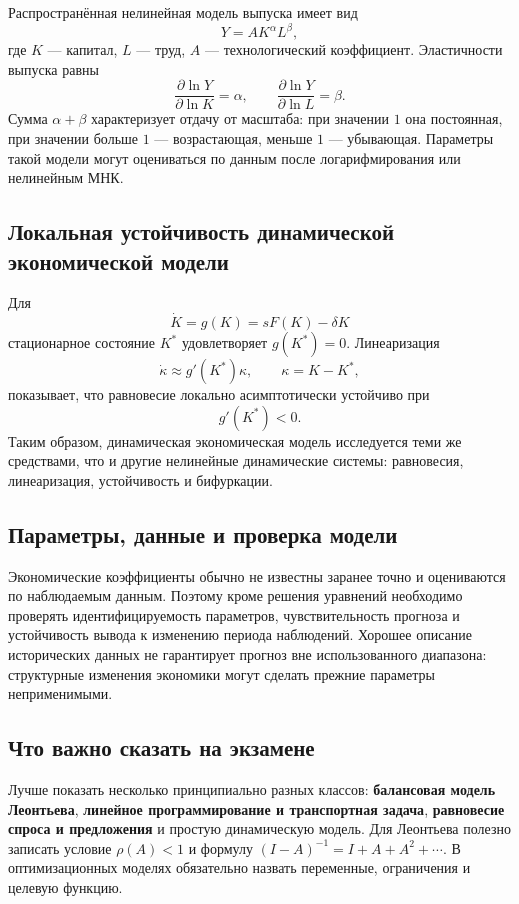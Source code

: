 Распространённая нелинейная модель выпуска имеет вид
\[
    \boxed{Y=A K^\alpha L^\beta,}
\]
где $K$ --- капитал, $L$ --- труд, $A$ --- технологический коэффициент.
Эластичности выпуска равны
\[
    \frac{\partial\ln Y}{\partial\ln K}=\alpha,
    \qquad
    \frac{\partial\ln Y}{\partial\ln L}=\beta.
\]
Сумма $\alpha+\beta$ характеризует отдачу от масштаба: при значении $1$ она
постоянная, при значении больше $1$ --- возрастающая, меньше $1$ --- убывающая.
Параметры такой модели могут оцениваться по данным после логарифмирования или
нелинейным МНК.

\subsection{Локальная устойчивость динамической экономической модели}

Для
\[
    \dot K=g(K)=sF(K)-\delta K
\]
стационарное состояние $K^*$ удовлетворяет $g(K^*)=0$. Линеаризация
\[
    \dot{\kappa}\approx g'(K^*)\kappa,
    \qquad \kappa=K-K^*,
\]
показывает, что равновесие локально асимптотически устойчиво при
\[
    \boxed{g'(K^*)<0.}
\]
Таким образом, динамическая экономическая модель исследуется теми же средствами,
что и другие нелинейные динамические системы: равновесия, линеаризация,
устойчивость и бифуркации.

\subsection{Параметры, данные и проверка модели}

Экономические коэффициенты обычно не известны заранее точно и оцениваются по
наблюдаемым данным. Поэтому кроме решения уравнений необходимо проверять
идентифицируемость параметров, чувствительность прогноза и устойчивость вывода к
изменению периода наблюдений. Хорошее описание исторических данных не гарантирует
прогноз вне использованного диапазона: структурные изменения экономики могут
сделать прежние параметры неприменимыми.

\subsection{Что важно сказать на экзамене}

Лучше показать несколько принципиально разных классов: \textbf{балансовая
модель Леонтьева}, \textbf{линейное программирование и транспортная задача},
\textbf{равновесие спроса и предложения} и простую динамическую модель.
Для Леонтьева полезно записать условие $\rho(A)<1$ и формулу
$(I-A)^{-1}=I+A+A^2+\cdots$. В оптимизационных моделях обязательно назвать
переменные, ограничения и целевую функцию.

\newpage
